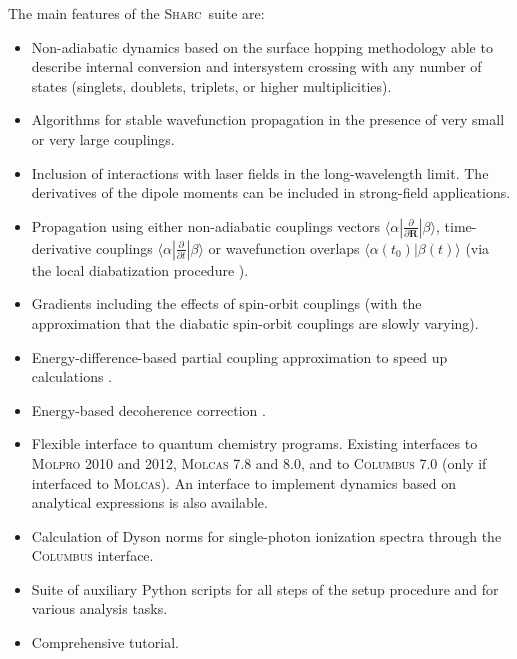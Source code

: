 \documentclass[a4paper,11pt,DIV=15,openany,twoside=false]{scrbook}
\newcommand{\sharc}{\textsc{Sharc}}
\begin{document}
The main features of the \sharc\ suite are:
\begin{itemize}
  \item Non-adiabatic dynamics based on the surface hopping methodology able to describe internal conversion and intersystem crossing with any number of states (singlets, doublets, triplets, or higher multiplicities).
  \item Algorithms for stable wavefunction propagation in the presence of very small or very large couplings.
  \item Inclusion of interactions with laser fields in the long-wavelength limit. The derivatives of the dipole moments can be included in strong-field applications.
  \item Propagation using either non-adiabatic couplings vectors $\langle\alpha|\frac{\partial}{\partial \mathbf{R}}|\beta\rangle$, time-derivative couplings $\langle\alpha|\frac{\partial}{\partial t}|\beta\rangle$ or wavefunction overlaps $\langle\alpha(t_0)|\beta(t)\rangle$ (via the local diabatization procedure \cite{Granucci2007JCP}).
  \item Gradients including the effects of spin-orbit couplings (with the approximation that the diabatic spin-orbit couplings are slowly varying).
  \item Energy-difference-based partial coupling approximation to speed up calculations \cite{Pittner2009CP}.
  \item Energy-based decoherence correction \cite{Granucci2007JCP}.
  \item Flexible interface to quantum chemistry programs. Existing interfaces to \textsc{Molpro} 2010 and 2012, \textsc{Molcas} 7.8 and 8.0, and to \textsc{Columbus 7.0} (only if interfaced to \textsc{Molcas}). An interface to implement dynamics based on analytical expressions is also available.
  \item Calculation of Dyson norms for single-photon ionization spectra through the \textsc{Columbus} interface.
  \item Suite of auxiliary Python scripts for all steps of the setup procedure and for various analysis tasks.
  \item Comprehensive tutorial.
\end{itemize}

\end{document}
